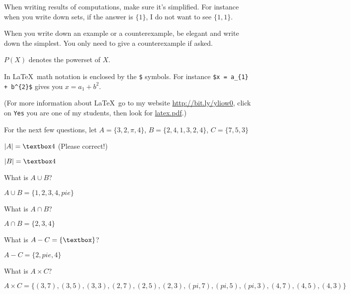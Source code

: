 


\renewcommand\AUTHOR{nweadick1@cougars.ccis.edu} %


\topmattertwo

When writing results of computations, make sure it's simplified.
For instance when you write down sets,
if the answer is $\{1\}$, I do not
want to see $\{1, 1\}$.

When you write down an example or a counterexample,
be elegant and write down the simplest.
You only need to give a counterexample if asked.

$P(X)$ denotes the powerset of $X$.

In \LaTeX\, math notation is enclosed by the \verb!$! symbols.
For instance \verb!$x = a_{1} + b^{2}$! gives you $x = a_{1} + b^{2}$. 

(For more information about \LaTeX\, go to my
website
\href{http://bit.ly/yliow0}{http://bit.ly/yliow0},
click on \verb!Yes!
you are one of my students,
then look for
\href{https://drive.google.com/file/d/0BzjYrK0VFuMWZm5xV0kyR3J2Zm8/view?usp=sharing}{latex.pdf}.)

For the next few questions,
let $A = \{3, 2, \pi, 4\}$, $B = \{2,4,1,3,2,4\}$, $C = \{7, 5, 3\}$ 

\nextq
$|A| =  \answerbox{ 4 } $ (Please correct!)

\nextq
$|B| = \answerbox{ 4 } $

\nextq
What is $A \cup B$?
\begin{answerlong}
$A \cup B = \{ 1,2,3,4,pie\}$
\end{answerlong}

\nextq
What is $A \cap B$?
\begin{answerlong}
$A \cap B = \{2,3,4\}$
\end{answerlong}

\nextq
What is $A - C = \{ \answerbox{} \}$?
\begin{answerlong}
$A - C = \{ 2,pie,4 \}$
\end{answerlong}

\nextq
What is $A \times C$?
\begin{answerlong}
$A \times C = \{ (3,7),(3,5),(3,3),(2,7),(2,5),(2,3),(pi,7),(pi,5),(pi,3),(4,7),(4,5),(4,3)\}$
\end{answerlong}

